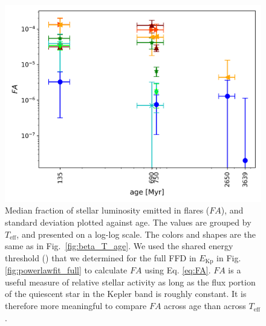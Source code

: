 \documentclass{aa}
\begin{document}
\begin{figure}[ht!]
    \centering
    \includegraphics[width=\hsize]{pics/FA/FA_T_age_Ethresh.png}
    \caption{Median fraction of stellar luminosity emitted in flares ($FA$), and standard deviation plotted against age. The values are grouped by $T_\mathrm{eff}$, and presented on a log-log scale. The colors and shapes are the same as in Fig.~\ref{fig:beta_T_age}. We used the shared energy threshold (\unskip) that we determined for the full FFD in $E_\mathrm{Kp}$ in Fig. \ref{fig:powerlawfit_full} to calculate $FA$ using Eq. \ref{eq:FA}. $FA$ is a useful measure of relative stellar activity as long as the flux portion of the quiescent star in the Kepler band is roughly constant. It is therefore more meaningful to compare $FA$ across age than across $T_\mathrm{eff}$.}   
    \label{fig:FA}
\end{figure}
\end{document}
